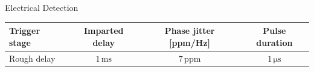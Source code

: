 \documentclass[aspectratio=169, 10pt]{beamer}
\begin{document}
\begin{frame}{Electrical Detection}
  \centering
  \resizebox{\textwidth}{!}{}

  \small
  \begin{tabular}{l S[table-format=2.2] S[table-format=1.3] S[table-format=3.1]}
    \toprule
    \textbf{Trigger stage} & {\textbf{Imparted delay}} & {\textbf{Phase jitter [ppm/Hz]}} & {\textbf{Pulse duration}}\\
    \midrule
    Rough delay             & {$1\,\unit{\milli\second}$}                 & {$7\,\text{ppm}$}          & {$1\,\unit{\micro\second}$}\\
    \bottomrule
  \end{tabular}
\end{frame}


%
%  
%
\end{document}
